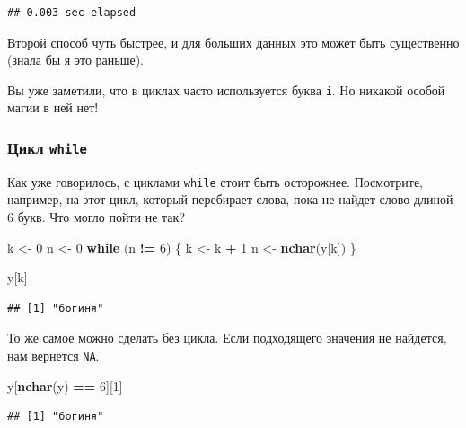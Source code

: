 \documentclass[
]{book}
\newenvironment{Shaded}{\begin{snugshade}}{\end{snugshade}}
\newcommand{\ControlFlowTok}[1]{\textcolor[rgb]{0.13,0.29,0.53}{\textbf{#1}}}
\newcommand{\DecValTok}[1]{\textcolor[rgb]{0.00,0.00,0.81}{#1}}
\newcommand{\FunctionTok}[1]{\textcolor[rgb]{0.13,0.29,0.53}{\textbf{#1}}}
\newcommand{\NormalTok}[1]{#1}
\newcommand{\OtherTok}[1]{\textcolor[rgb]{0.56,0.35,0.01}{#1}}
\newcommand{\SpecialCharTok}[1]{\textcolor[rgb]{0.81,0.36,0.00}{\textbf{#1}}}
\theoremstyle{definition}
\theoremstyle{definition}
\theoremstyle{definition}
\theoremstyle{definition}
\theoremstyle{remark}
\begin{document}
\begin{verbatim}
## 0.003 sec elapsed
\end{verbatim}

Второй способ чуть быстрее, и для больших данных это может быть существенно (знала бы я это раньше).

Вы уже заметили, что в циклах часто используется буква \texttt{i}. Но никакой особой магии в ней нет!

\hypertarget{ux446ux438ux43aux43b-while}{%
\subsubsection{\texorpdfstring{Цикл \texttt{while}}{Цикл while}}\label{ux446ux438ux43aux43b-while}}

Как уже говорилось, с циклами \texttt{while} стоит быть осторожнее. Посмотрите, например, на этот цикл, который перебирает слова, пока не найдет слово длиной 6 букв. Что могло пойти не так?

\begin{Shaded}
\begin{Highlighting}[]
\NormalTok{k }\OtherTok{\textless{}{-}} \DecValTok{0}
\NormalTok{n }\OtherTok{\textless{}{-}} \DecValTok{0}
\ControlFlowTok{while}\NormalTok{ (n }\SpecialCharTok{!=} \DecValTok{6}\NormalTok{) \{}
\NormalTok{  k }\OtherTok{\textless{}{-}}\NormalTok{ k }\SpecialCharTok{+} \DecValTok{1}
\NormalTok{  n }\OtherTok{\textless{}{-}} \FunctionTok{nchar}\NormalTok{(y[k])}
\NormalTok{\}}

\NormalTok{y[k]}
\end{Highlighting}
\end{Shaded}

\begin{verbatim}
## [1] "богиня"
\end{verbatim}

То же самое можно сделать без цикла. Если подходящего значения не найдется, нам вернется \texttt{NA}.

\begin{Shaded}
\begin{Highlighting}[]
\NormalTok{y[}\FunctionTok{nchar}\NormalTok{(y) }\SpecialCharTok{==} \DecValTok{6}\NormalTok{][}\DecValTok{1}\NormalTok{] }
\end{Highlighting}
\end{Shaded}

\begin{verbatim}
## [1] "богиня"
\end{verbatim}
\end{document}
